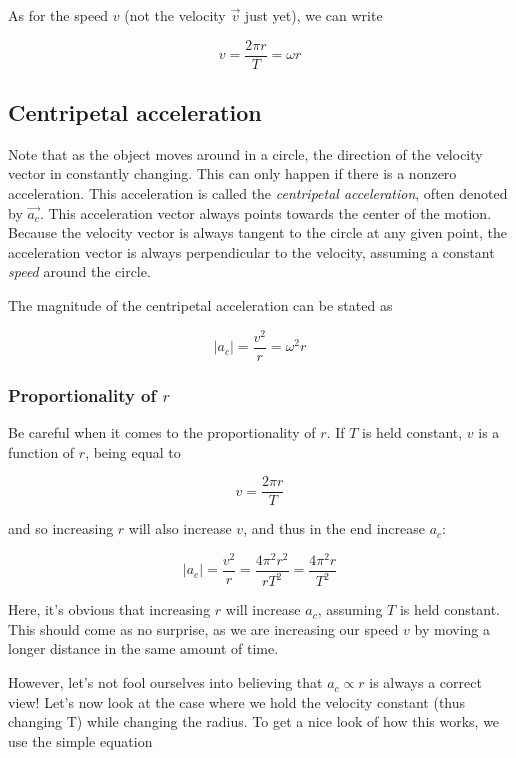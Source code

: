 As for the speed $v$ (not the velocity $\vec{v}$ just yet), we can write

\begin{equation}
v = \frac{2 \pi r}{T} = \omega r
\end{equation}


\subsection{Centripetal acceleration}

Note that as the object moves around in a circle, the direction of the velocity vector in constantly changing. This can only happen if there is a nonzero acceleration. This acceleration is called the \emph{centripetal acceleration}, often denoted by $\vec{a_c}$. This acceleration vector always points towards the center of the motion. Because the velocity vector is always tangent to the circle at any given point, the acceleration vector is always perpendicular to the velocity, assuming a constant \emph{speed} around the circle. 

The magnitude of the centripetal acceleration can be stated as

\begin{equation}
|a_c| = \frac{v^2}{r} = \omega^2 r
\end{equation}

\subsubsection{Proportionality of $r$}
Be careful when it comes to the proportionality of $r$. If $T$ is held constant, $v$ is a function of $r$, being equal to

\begin{equation}
v = \frac{2 \pi r}{T}
\end{equation}

and so increasing $r$ will also increase $v$, and thus in the end increase $a_c$:

\begin{equation}
|a_c| = \frac{v^2}{r} = \frac{4 \pi^2 r^2}{r T^2} = \frac{4 \pi^2 r}{T^2}
\end{equation}

Here, it's obvious that increasing $r$ will increase $a_c$, assuming $T$ is held constant. This should come as no surprise, as we are increasing our speed $v$ by moving a longer distance in the same amount of time.

However, let's not fool ourselves into believing that $a_c \propto r$ is always a correct view! Let's now look at the case where we hold the velocity constant (thus changing T) while changing the radius. To get a nice look of how this works, we use the simple equation

